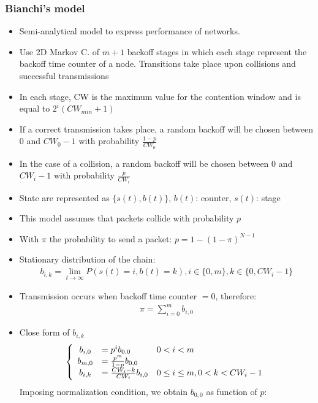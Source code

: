 \subsubsection{Bianchi's model}
\begin{itemize}
	\item Semi-analytical model to express performance of networks.
	\item Use 2D Markov C. of $m+1$ backoff stages in which each stage represent the backoff time counter of a node. Transitions take place upon collisions and successful transmissions
	\item In each stage, CW is the maximum value for the contention window and is equal to $2^i(CW_{min}+1)$
	\item If a correct transmission takes place, a random backoff will be chosen between $0$ and $CW_{0}-1$  with probability $\frac{1 - p}{CW_0}$ 
	\item In the case of a collision, a random backoff will be chosen between $0$ and $CW_{i}-1$ with probability $\frac{p}{C W_i}$
	\item State are represented as $\{s(t), b(t)\}$, $b(t)$: counter, $s(t)$: stage
	\item This model assumes that packets collide with probability $p$
	\item With $\pi$ the probability to send a packet: $p = 1 - (1 - \pi)^{N-1}$
	\item Stationary distribution of the chain:
	\begin{align*}
		b_{i,k} = \lim_{t \to \infty} P(s(t) = i, b(t) = k), i \in \{0, m\}, k \in \{0, CW_i - 1\}
	\end{align*}
	\item Transmission occurs when backoff time counter $=0$, therefore:
	\begin{align*}
		\pi = \sum_{i=0}^m b_{i,0}
	\end{align*}
	\item Close form of $b_{i,k}$
	\begin{align*}
		\left\{
			\begin{array}{c l l}
				b_{i,0} &= p^i b_{0,0} & 0 < i < m \\
				b_{m,0} &= \frac{p^m}{1-p} b_{0,0} \\
				b_{i,k} &= \frac{CW_i-k}{CW_i} b_{i,0} & 0 \leq i \leq m, 0 < k < CW_i-1
			\end{array}
		\right.
	\end{align*}
	Imposing normalization condition, we obtain $b_{0,0}$ as function of $p$:
	\begin{align*}

\end{align*}
\end{itemize}
